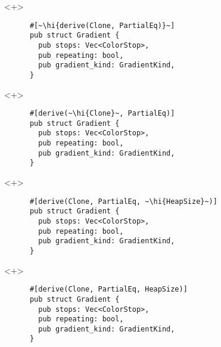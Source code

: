 \documentclass[usepdftitle=false]{beamer}
\renewcommand{\&}{\makebox[\widthof{\ampersand}][c]{\scalebox{0.9}[1.0]{\Book\ampersand}}}
\newcommand{\+}{\makebox[\widthof{+}][c]{\raisebox{-.2\height}{\scalefont{1.5}\Light+}}}
\newcommand{\hi}[1]{%
\tikz[baseline=(A.base)]
 \node[highlighting=0,inner sep=0pt,text depth=0pt] (A) {#1};%
}
\begin{document}
\begin{frame}[fragile]
  \begin{onlyenv}<+>
    \begin{verbatim}
      #[~\hi{derive(Clone, PartialEq)}~]
      pub struct Gradient {
        pub stops: Vec<ColorStop>,
        pub repeating: bool,
        pub gradient_kind: GradientKind,
      }
    \end{verbatim}
  \end{onlyenv}
  \begin{onlyenv}<+>
    \begin{verbatim}
      #[derive(~\hi{Clone}~, PartialEq)]
      pub struct Gradient {
        pub stops: Vec<ColorStop>,
        pub repeating: bool,
        pub gradient_kind: GradientKind,
      }
    \end{verbatim}
  \end{onlyenv}
  \begin{onlyenv}<+>
    \begin{verbatim}
      #[derive(Clone, PartialEq, ~\hi{HeapSize}~)]
      pub struct Gradient {
        pub stops: Vec<ColorStop>,
        pub repeating: bool,
        pub gradient_kind: GradientKind,
      }
    \end{verbatim}
  \end{onlyenv}
  \begin{onlyenv}<+>
    \begin{verbatim}
      #[derive(Clone, PartialEq, HeapSize)]
      pub struct Gradient {
        pub stops: Vec<ColorStop>,
        pub repeating: bool,
        pub gradient_kind: GradientKind,
      }
    \end{verbatim}
  \end{onlyenv}
\end{frame}

\end{document}
